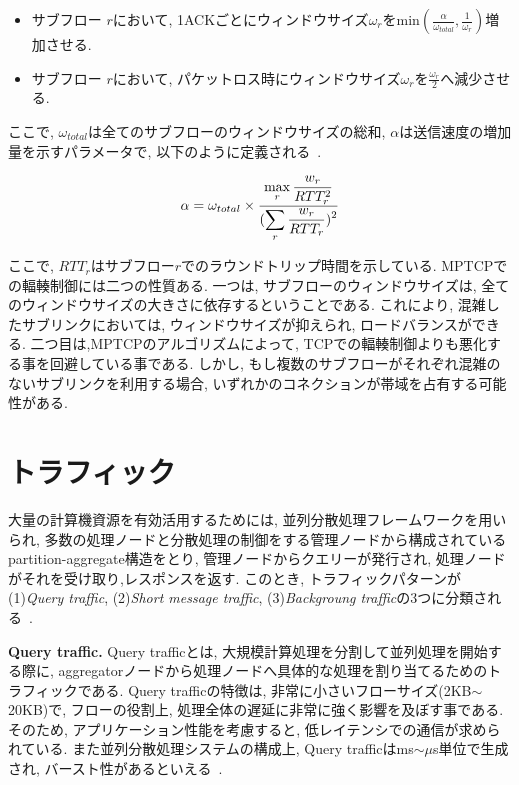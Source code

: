 \begin{itemize}
\item サブフロー $r$において,
1ACKごとにウィンドウサイズ$\omega_{r}$をmin$(\frac{\alpha}{\omega_{total}},
\frac{1}{\omega_r})$増加させる.
\item サブフロー $r$において, パケットロス時にウィンドウサイズ$\omega_r$を$\frac{\omega_r}{2}$へ減少させる.
\end{itemize}
ここで, $\omega_{total}$は全てのサブフローのウィンドウサイズの総和, $\alpha$は送信速度の増加量を示すパラメータで,
以下のように定義される~\cite{cong}.

\vspace{-2mm}
\begin{eqnarray}
 \alpha = \omega_{total} \times
\frac{\displaystyle \max_{r} \frac{w_r}{RTT^2_r}}{\displaystyle
(\sum_{r}\frac{w_r}{RTT_r})^2}
\label{alpha}
\vspace{-2mm}
\end{eqnarray}

ここで, $RTT_r$はサブフロー$r$でのラウンドトリップ時間を示している.
MPTCPでの輻輳制御には二つの性質ある.
一つは, サブフローのウィンドウサイズは, 全てのウィンドウサイズの大きさに依存するということである.
これにより, 混雑したサブリンクにおいては, ウィンドウサイズが抑えられ, ロードバランスができる.
二つ目は,MPTCPのアルゴリズムによって, TCPでの輻輳制御よりも悪化する事を回避している事である.
しかし, もし複数のサブフローがそれぞれ混雑のないサブリンクを利用する場合, いずれかのコネクションが帯域を占有する可能性がある.


\section{トラフィック}
\label{sec:traffic}

大量の計算機資源を有効活用するためには,
並列分散処理フレームワークを用いられ, 多数の処理ノードと分散処理の制御をする管理ノードから構成されているpartition-aggregate構造をとり,
管理ノードからクエリーが発行され, 処理ノードがそれを受け取り,レスポンスを返す.
このとき, トラフィックパターンが  (1){\it Query traffic}, (2){\it Short message
traffic}, (3){\it Backgroung traffic}の3つに分類される~\cite{dctcp}.

{\bf Query traffic. }Query trafficとは, 大規模計算処理を分割して並列処理を開始する際に,
aggregatorノードから処理ノードへ具体的な処理を割り当てるためのトラフィックである.
Query trafficの特徴は, 非常に小さいフローサイズ(2KB$\sim$20KB)で,
フローの役割上, 処理全体の遅延に非常に強く影響を及ぼす事である.
そのため, アプリケーション性能を考慮すると, 低レイテンシでの通信が求められている.
また並列分散処理システムの構成上, Query trafficはms$\sim \mu$s単位で生成され,
バースト性があるといえる~\cite{dctcp}.


